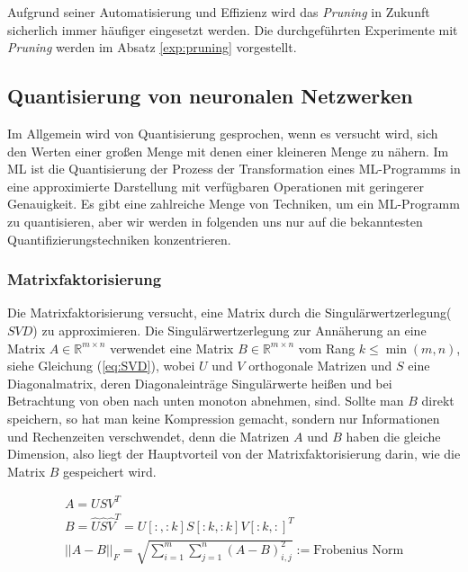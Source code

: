\documentclass[12pt,a4paper]{scrartcl}
\numberwithin{equation}{section}
\newcommand{\R}{\mathbb{R}} %
\begin{document}
Aufgrund seiner Automatisierung und Effizienz wird das \textit{Pruning} in Zukunft sicherlich immer häufiger eingesetzt werden. Die durchgeführten Experimente mit \textit{Pruning} werden im Absatz \ref{exp:pruning} vorgestellt.


\subsection{ Quantisierung von neuronalen Netzwerken}\label{kom:quantization}
Im Allgemein wird von Quantisierung gesprochen, wenn es versucht wird, sich den Werten einer großen Menge mit denen einer kleineren Menge zu nähern. Im \ac{ML} ist die Quantisierung der Prozess der Transformation eines ML-Programms in eine approximierte Darstellung mit verfügbaren Operationen mit geringerer Genauigkeit.
Es gibt eine zahlreiche Menge von Techniken, um ein ML-Programm zu quantisieren, aber wir werden in folgenden uns nur auf die bekanntesten Quantifizierungstechniken konzentrieren.
\subsubsection{Matrixfaktorisierung}
Die Matrixfaktorisierung versucht, eine Matrix durch die Singulärwertzerlegung($ SVD $) zu approximieren.
Die Singulärwertzerlegung zur Annäherung an eine Matrix $ A \in \R^{m\times n} $ verwendet eine Matrix $ B \in \R^{m\times n}  $ vom Rang $ k \le \min(m, n) $, siehe Gleichung (\ref{eq:SVD}), wobei $ U $ und $ V $ orthogonale Matrizen und $ S $ eine Diagonalmatrix, deren Diagonaleinträge Singulärwerte heißen und bei Betrachtung von oben nach unten monoton abnehmen, sind. Sollte man $ B $ direkt speichern, so hat man keine Kompression gemacht, sondern nur Informationen und Rechenzeiten verschwendet, denn die Matrizen $ A $ und $ B $ haben die gleiche Dimension, also liegt der Hauptvorteil von der Matrixfaktorisierung darin, wie die Matrix $ B $ gespeichert wird.

\begin{equation}\label{eq:SVD}
	\begin{array}{l}
	A = USV^T\\
	B = \widehat{U}\widehat{S}\widehat{V}^T =  U[:,:k] S[:k,:k] V[:k, :]^T \\
	{||A - B||_F} = \sqrt{\sum_{i = 1}^{m} \sum_{j =1}^{n} (A-B)_{i,j}^2} := \text{Frobenius Norm}
	\end{array}	
\end{equation}
\end{document}
